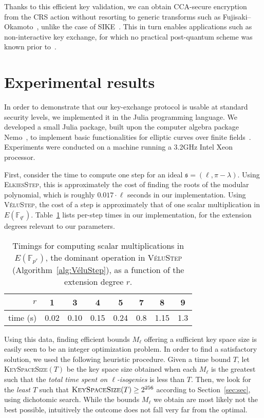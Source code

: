 \documentclass{llncs}
\newcommand{\F}{\mathbb{F}}
\newcommand{\algstyle}[1]{\textsc{#1}}
\renewcommand{\frak}{\mathfrak}
\begin{document}
Thanks to this efficient key validation, 
we can obtain CCA-secure encryption from the
CRS action without resorting to generic transforms such as
Fujisaki--Okamoto~\cite{10.1007/3-540-48405-1_34}, unlike the case of
SIKE~\cite{SIKE,10.1007/978-3-319-70500-2_12}. This in turn enables
applications such as non-interactive key exchange, for which no
practical post-quantum scheme was known prior to~\cite{csidh}.


\section{Experimental results}
\label{sec:exp}

In order to demonstrate that our key-exchange protocol is usable
at standard security levels, we implemented it in the Julia
programming language.
We developed a small Julia package, built upon 
the computer algebra package Nemo~\cite{nemo},
to implement basic functionalities
for elliptic curves over finite fields~\cite{package}.
Experiments were conducted on a machine running a 3.2GHz Intel Xeon processor.

First, consider the
time to compute one step for an ideal $\frak s = (\ell,\pi-\lambda)$.
Using \algstyle{ElkiesStep}, this is approximately
the cost of finding the roots of the modular polynomial,
which is roughly $0.017\cdot\ell$ seconds in our implementation.
Using \algstyle{VéluStep}, the cost of a step is approximately
that of one scalar multiplication in $E(\F_{q^r})$.
Table~\ref{tab:time-vs-r} lists per-step times in our implementation,
for the extension degrees relevant to our parameters.

\begin{table}
    \centering
    \begin{tabular}{r@{\;}|@{\;}c@{\ \ }c@{\ \ }c@{\ \ }c@{\ \ }c@{\ \ }c@{\ \ }c}
        $r$ & 1 & 3 & 4 & 5 & 7 & 8 & 9 \\
        \hline
        time (s) & 0.02 & 0.10 & 0.15 & 0.24 & 0.8 & 1.15 & 1.3
    \end{tabular}
    \smallskip
    \caption{Timings for computing scalar multiplications in
    $E(\F_{p^r})$, the dominant operation in \algstyle{VéluStep}
    (Algorithm~\ref{alg:VéluStep}), as a function of the extension
    degree $r$.}
    \label{tab:time-vs-r}
\end{table}

Using this data, finding efficient bounds $M_\ell$
offering a sufficient key space size is easily seen to be an
integer optimization problem. In order to find a
satisfactory solution, we used the following heuristic procedure.
Given a time bound $T$, let \algstyle{KeySpaceSize}$(T)$ be
the key space size obtained when each $M_\ell$ is the greatest such
that the \emph{total time spent on $\ell$-isogenies} is less than $T$.
Then, we look for the \emph{least $T$} such that
$
	\algstyle{KeySpaceSize}(T)\geq 2^{256}
$
according to Section~\ref{sec:sec}, using dichotomic search.
While the bounds $M_\ell$
we obtain are most likely not the best possible, intuitively
the outcome does not fall very far from the optimal.
\end{document}

